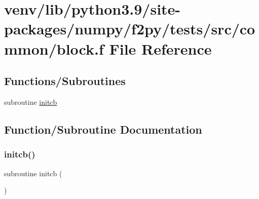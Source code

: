 \hypertarget{block_8f}{}\section{venv/lib/python3.9/site-\/packages/numpy/f2py/tests/src/common/block.f File Reference}
\label{block_8f}
\subsection*{Functions/\+Subroutines}
\begin{DoxyCompactItemize}
\item 
subroutine \hyperlink{block_8f_a57a5ae7097ae9e656a835d2a3fa92bca}{initcb}
\end{DoxyCompactItemize}


\subsection{Function/\+Subroutine Documentation}
\mbox{\label{block_8f_a57a5ae7097ae9e656a835d2a3fa92bca}} 
\subsubsection{\texorpdfstring{initcb()}{initcb()}}
{\footnotesize\ttfamily subroutine initcb (\begin{DoxyParamCaption}{ }\end{DoxyParamCaption})}

